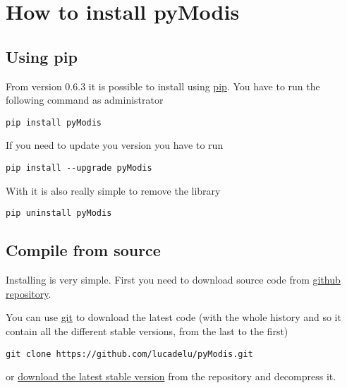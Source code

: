 \documentclass[a4paper,11pt,oneside]{sphinxmanual}
\begin{document}
\section{How to install pyModis}
\label{info:how-to-install-pymodis}

\subsection{Using pip}
\label{info:using-pip}
From version 0.6.3 it is possible to install  using
\href{https://pypi.python.org/pypi/pip}{pip}. You have to run the following
command as administrator

\begin{Verbatim}[commandchars=\\\{\}]
pip install pyModis
\end{Verbatim}

If you need to update you  version you have to run

\begin{Verbatim}[commandchars=\\\{\}]
pip install --upgrade pyModis
\end{Verbatim}

With  it is also really simple to remove the library

\begin{Verbatim}[commandchars=\\\{\}]
pip uninstall pyModis
\end{Verbatim}


\subsection{Compile from source}
\label{info:compile-from-source}
Installing  is very simple. First you need to download 
source code from \href{https://github.com/lucadelu/pyModis}{github repository}.

You can use \href{http://git-scm.com/}{git} to download the latest code
(with the whole history and so it contain all the different stable versions,
from the last to the first)

\begin{Verbatim}[commandchars=\\\{\}]
git clone https://github.com/lucadelu/pyModis.git
\end{Verbatim}

or \href{https://github.com/lucadelu/pyModis/tags}{download the latest stable version}
from the repository and decompress it.
\end{document}
